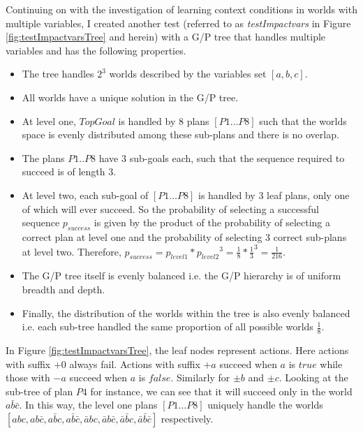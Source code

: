 \documentclass[a4paper]{article}
\newcommand{\tiv}{\emph{testImpactvars}\xspace}
\begin{document}
Continuing on with the investigation of learning context conditions in worlds with multiple variables, I created another test (referred to as \tiv in Figure \ref{fig:testImpactvarsTree} and herein) with a G/P tree that handles multiple variables and has the following properties.
\begin{itemize}
\item The tree handles $2^3$ worlds described by the variables set $[a,b,c]$.
\item All worlds have a unique solution in the G/P tree.
\item At level one, $TopGoal$ is handled by $8$ plans $[P1 \ldots P8]$ such that the worlds space is evenly distributed among these sub-plans and there is no overlap.
\item The plans ${P1..P8}$ have $3$ sub-goals each, such that the sequence required to succeed is of length $3$.
\item At level two, each sub-goal of $[P1 \ldots P8]$ is handled by $3$ leaf plans, only one of which will ever succeed. So the probability of selecting a successful sequence $p_{success}$ is given by the product of the probability of selecting a correct plan at level one and the probability of selecting $3$ correct sub-plans at level two. Therefore, $p_{success} = p_{level1} * {p_{level2}}^3 = \frac{1}{8} * {\frac{1}{3}}^3 = \frac{1}{216}$.
\item The G/P tree itself is evenly balanced i.e. the G/P hierarchy is of uniform breadth and depth.
\item Finally, the distribution of the worlds within the tree is also evenly balanced i.e. each sub-tree handled the same proportion of all possible worlds $\frac{1}{8}$.
\end{itemize}

In Figure \ref{fig:testImpactvarsTree}, the leaf nodes represent actions. Here actions with suffix $+0$ always fail. Actions with suffix $+a$ succeed when $a$ is $true$ while those with $-a$ succeed when $a$ is $false$. Similarly for $\pm b$ and $\pm c$. Looking at the sub-tree of plan $P4$ for instance, we can see that it will succeed only in the world $a\bar{b}\bar{c}$. In this way, the level one plans $[P1 \ldots P8]$ uniquely handle the worlds $[abc, ab\bar{c}, a\bar{b}c, a\bar{b}\bar{c}, \bar{a}bc, \bar{a}b\bar{c}, \bar{a}\bar{b}c, \bar{a}\bar{b}\bar{c}]$ respectively.
\end{document}
